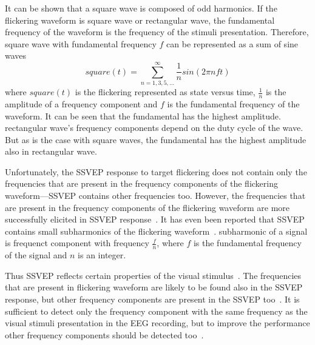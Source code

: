 It can be shown that a \gls{square wave} is composed of odd \glspl{harmonic}. If the \gls{flickering waveform} is \gls{square wave} or \gls{rectangular wave}, the \gls{fundamental} frequency of the waveform is the frequency of the stimuli presentation. Therefore, \gls{square wave} with \gls{fundamental} frequency $f$ can be represented as a sum of sine waves
\begin{equation}
	\label{eq:square}
	square(t) = \sum_{n=1,3,5,\dots}^{\infty}\frac{1}{n} sin(2\pi nft)
\end{equation}
where $square(t)$ is the \gls{flickering} represented as \gls{state} versus time, $\frac{1}{n}$ is the amplitude of a \gls{frequency component} and $f$ is the \gls{fundamental} frequency of the waveform. It can be seen that the \gls{fundamental} has the highest amplitude. \Gls{rectangular wave}'s \glspl{frequency component} depend on the \gls{duty cycle} of the wave. But as is the case with \glspl{square wave}, the \gls{fundamental} has the highest amplitude also in \gls{rectangular wave}.

Unfortunately, the \gls{SSVEP} response to \gls{target} \gls{flickering} does not contain only the frequencies that are present in the \glspl{frequency component} of the \gls{flickering waveform}---\gls{SSVEP} contains other frequencies too. However, the frequencies that are present in the \glspl{frequency component} of the \gls{flickering waveform} are more successfully elicited in \gls{SSVEP} response~\cite{square_sine}. It has even been reported that \gls{SSVEP} contains small \glspl{subharmonic} of the \gls{flickering waveform}~\cite{ssvep_response}. \Gls{subharmonic} of a signal is \gls{frequenct component} with frequency $\frac{f}{n}$, where $f$ is the \gls{fundamental} frequency of the signal and $n$ is an integer.

Thus \gls{SSVEP} reflects certain properties of the visual stimulus~\cite{ssvep_response}. The frequencies that are present in \gls{flickering waveform} are likely to be found also in the \gls{SSVEP} response, but other \glspl{frequency component} are present in the \gls{SSVEP} too~\cite{square_sine}. It is sufficient to detect only the \gls{frequency component} with the same frequency as the visual stimuli presentation in the \gls{EEG} recording, but to improve the performance other \glspl{frequency component} should be detected too~\cite{harmonic_imrpovement}.


